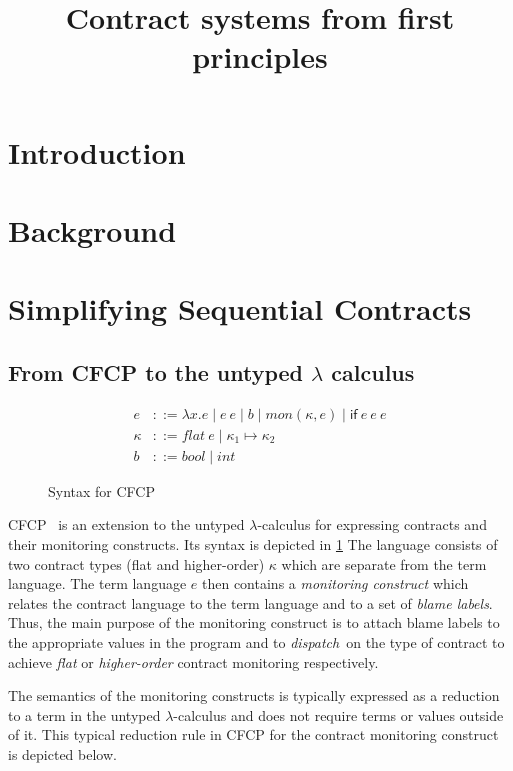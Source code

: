 \documentclass[acmsmall]{acmart}
\title{Contract systems from first principles}
\begin{document}
\maketitle

\section{Introduction}



\section{Background}

\section{Simplifying Sequential Contracts}

\subsection{From CFCP to the untyped $\lambda$ calculus}

\begin{figure}
   \begin{align*}
   e &::= \lambda x . e \mid e~e \mid b \mid \mathit{mon}(\kappa, e) \mid \mathsf{if}~e~e~e \\
   \kappa &::= \mathit{flat}~e \mid \kappa_1 \mapsto \kappa_2 \\
   b &::= \mathit{bool} \mid \mathit{int}
   \end{align*}
   \caption{Syntax for CFCP}\label{figure:syntax:cfcp}
\end{figure}

CFCP~\citep{DBLP:conf/icfp/FindlerF02} is an extension to the untyped $\lambda$-calculus for 
expressing contracts and their monitoring constructs.
Its syntax is depicted in \cref{figure:syntax:cfcp}
The language consists of two contract types (flat and higher-order) $\kappa$ which are separate from the term language.
The term language $e$ then contains a \emph{monitoring construct} which relates the contract language to the term language and to a set of \emph{blame labels}.
Thus, the main purpose of the monitoring construct is to attach blame labels to the appropriate values in the program and to \emph{dispatch} on the type of contract to achieve \emph{flat} or \emph{higher-order} contract monitoring respectively.

The semantics of the monitoring constructs is typically expressed as a reduction to a term in the untyped $\lambda$-calculus and does not require terms or values outside of it. 
This typical reduction rule in CFCP for the contract monitoring construct is depicted below.
\end{document}
